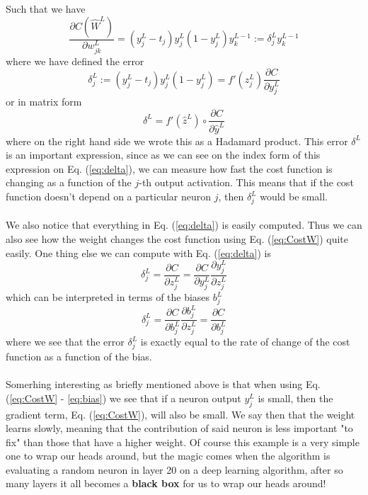 \documentclass[14pt, a4paper]{book}
\begin{document}
Such that we have
\begin{equation}\label{eq:CostW}
    \frac{\partial C(\hat W ^L) }{\partial w_{jk}^L}=\left(y_j^L-t_j\right)y_j^L(1-y_j^L)y_k^{L-1} :=\delta_j^Ly_k^{L-1}
\end{equation}
where we have defined the error
\begin{equation}\label{eq:delta}
    \delta_j^L:=\left(y_j^L-t_j\right)y_j^L(1-y_j^L)=f'(z_j^L)\frac{\partial C}{\partial y_j^L} 
\end{equation}
or in matrix form
$$
\delta^L = f'(\hat z ^L)\circ \frac{\partial C}{\partial \hat y ^L}
$$
where on the right hand side we wrote this as a Hadamard product. This error $\delta^L$ is an important expression, since as we can see on the index form of this expression on Eq. (\ref{eq:delta}), we can measure how fast the cost function is changing as a function of the $j$-th output activation. This means that if the cost function doesn't depend on a particular neuron $j$, then $\delta_j^L$ would be small.  \\
\\We also notice that everything in Eq. (\ref{eq:delta}) is easily computed. Thus we can also see how the weight changes the cost function using Eq. (\ref{eq:CostW}) quite easily. One thing else we can compute with Eq. (\ref{eq:delta}) is
$$
\delta_j^L=\frac{\partial C}{\partial z_j^L} =\frac{\partial C}{\partial y_j^L}\frac{\partial y_j^L}{\partial z_j^L}
$$
which can be interpreted in terms of the biases $b_j^L$
\begin{equation}\label{eq:bias}
    \delta_j^L=\frac{\partial C}{\partial b_j^L}\frac{\partial b_j^L}{\partial z_j^L} = \frac{\partial C}{\partial b_j^L} 
\end{equation}
where we see that the error $\delta_j^L$ is exactly equal to the rate of change of the cost function as a function of the bias.\\
\\Somerhing interesting as briefly mentioned above is that when using Eq. (\ref{eq:CostW} - \ref{eq:bias}) we see that if a neuron output $y_j^L$ is small, then the gradient term, Eq. (\ref{eq:CostW}), will also be small. We say then that the weight learns slowly, meaning that the contribution of said neuron is less important "to fix" than those that have a higher weight. Of course this example is a very simple one to wrap our heads around, but the magic comes when the algorithm is evaluating a random neuron in layer 20 on a deep learning algorithm, after so many layers it all becomes a \textbf{black box} for us to wrap our heads around!\\
\end{document}
